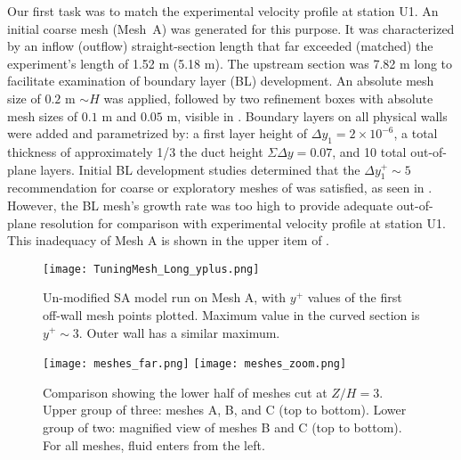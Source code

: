 \documentclass[11pt]{article}
\begin{document}
Our first task was to match the experimental velocity profile at station U1. An initial coarse mesh (Mesh~A) was generated for this purpose. It was characterized by an inflow (outflow) straight-section length that far exceeded (matched) the experiment's length of 1.52 m (5.18 m). The upstream section was 7.82 m long to facilitate examination of boundary layer (BL) development. An absolute mesh size of $0.2$ m $\sim H$ was applied, followed by two refinement boxes with absolute mesh sizes of $0.1$ m and $0.05$ m, visible in . Boundary layers on all physical walls were added and parametrized by: a first layer height of $\Delta y_1 = 2 \times 10^{-6}$, a total thickness of approximately 1/3 the duct height $\Sigma \Delta y = 0.07$, and 10 total out-of-plane layers. Initial BL development studies determined that the $\Delta y^+_1 \sim 5$ recommendation for coarse or exploratory meshes of \citet{spalart2001} was satisfied, as seen in . However, the BL mesh's growth rate was too high to provide adequate out-of-plane resolution for comparison with experimental velocity profile at station U1. This inadequacy of Mesh A is shown in the upper item of .

\begin{figure}[b!]
\centering
\texttt{[image: TuningMesh\_Long\_yplus.png]}
\caption{Un-modified SA model run on Mesh A, with $y^+$ values of the first off-wall mesh points plotted. Maximum value in the curved section is $y^+ \sim 3$. Outer wall has a similar maximum.}
\label{fig:initial_yplus}
\end{figure}

\begin{figure}[p]
\centering
\texttt{[image: meshes\_far.png]}
\texttt{[image: meshes\_zoom.png]}\\[1cm]
\caption{Comparison showing the lower half of meshes cut at $Z/H=3$. Upper group of three: meshes A, B, and C (top to bottom). Lower group of two: magnified view of meshes B and C (top to bottom). For all meshes, fluid enters from the left.}
\label{fig:mesh_overview}
\end{figure}
\end{document}
